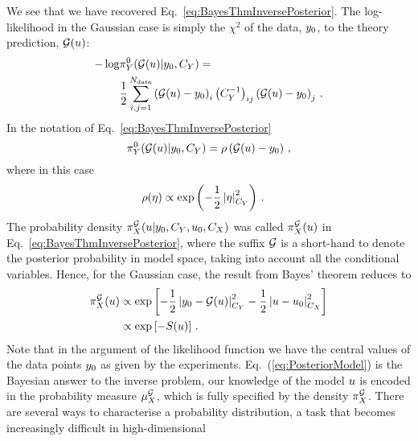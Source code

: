 We see that we have recovered Eq.~\ref{eq:BayesThmInversePosterior}. The
log-likelihood in the Gaussian case is simply the $\chi^2$ of the data,
$y_0$, to the theory prediction, $\mathcal{G}(u)$:
\begin{align}
  \label{eq:LikelyChiSq}
  -\log&\pi_{Y}^0(\mathcal{G}(u)|y_0,C_{Y}) = \nonumber \\ 
    &\frac12 \sum_{i,j=1}^{N_{\rm data}}
      \left(\mathcal{G}(u) - y_0 \right)_i
      \left(C_{Y}^{-1}\right)_{ij}
      \left(\mathcal{G}(u) - y_0 \right)_j
    \, .
\end{align}
In the notation of Eq.~\ref{eq:BayesThmInversePosterior}
\begin{equation}
  \label{eq:IdentifyRho}
  \pi_{Y}^0(\mathcal{G}(u)|y_0,C_{Y}) = \rho\left(
    \mathcal{G}(u) - y_0
  \right)\, ,
\end{equation}
where in this case 
\begin{align}
  \label{eq:RhoGauss}
  \rho(\eta) &\propto \exp\left(
               -\frac12 \left|\eta\right|_{C_{Y}}^2
               \right)\, .
\end{align}
The probability density $\pi^{\mathcal{G}}_{X}(u|y_0,
C_{Y},u_0,C_X)$ was called
$\pi_{X}^{\mathcal{G}}(u)$ in Eq.~\ref{eq:BayesThmInversePosterior}, where
the suffix $\mathcal{G}$ is a short-hand to denote the posterior probability in
model space, taking into account all the conditional variables. Hence, for the
Gaussian case, the result from Bayes' theorem reduces to
\begin{align}
  \label{eq:PosteriorModel}
  \pi_{X}^{\mathcal{G}}(u) 
  &\propto 
  \exp\left[
    -\frac12 \left| y_0 - \mathcal{G}(u) \right|_{C_{Y}} ^2
    -\frac12 \left| u - u_0 \right|_{C_X}^2
  \right] \nonumber\\ 
  &\propto
  \exp\left[
    - S(u)
  \right]\, .
\end{align}
Note that in the argument of the likelihood function we have the central values
of the data points $y_0$ as given by the experiments.
Eq.~(\ref{eq:PosteriorModel}) is the Bayesian answer to the inverse problem, our
knowledge of the model $u$ is encoded in the probability measure
$\mu_{X}^{\mathcal{G}}$, which is fully specified by the density
$\pi_{X}^{\mathcal{G}}$. There are several ways to characterise a probability
distribution, a task that becomes increasingly difficult in high-dimensional
